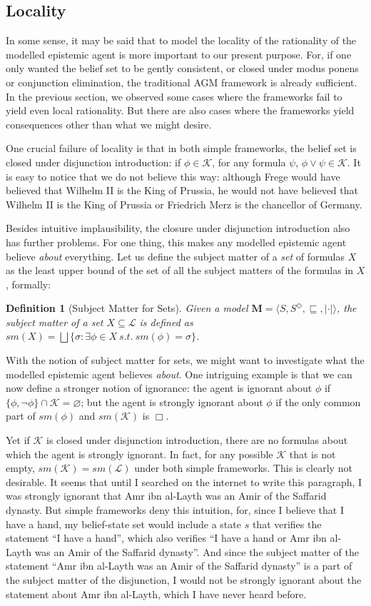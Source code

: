 \documentclass[12pt]{article}
\newtheorem{definition}{Definition}[section]
\newcommand{\K}{\mathcal{K}}
\begin{document}
\subsection{Locality}
In some sense, it may be said that to model the locality of the rationality of the modelled epistemic agent is more important to our present purpose. For, if one only wanted the belief set to be gently consistent, or closed under modus ponens or conjunction elimination, the traditional AGM framework is already sufficient. In the previous section, we observed some cases where the frameworks fail to yield even local rationality. But there are also cases where the frameworks yield consequences other than what we might desire. 
\par
One crucial failure of locality is that in both simple frameworks, the belief set is closed under disjunction introduction: if $\phi \in \K$, for any formula $\psi$, $\phi \lor \psi \in \K$. It is easy to notice that we do not believe this way: although Frege would have believed that Wilhelm II is the King of Prussia, he would not have believed that Wilhelm II is the King of Prussia or Friedrich Merz is the chancellor of Germany. 
\par
Besides intuitive implausibility, the closure under disjunction introduction also has further problems. For one thing, this makes any modelled epistemic agent believe \textit{about} everything. Let us define the subject matter of a \textit{set} of formulas $X$ as the least upper bound of the set of all the subject matters of the formulas in $X$, formally:
\begin{definition}[Subject Matter for Sets]
    Given a model $\bm{M} = \langle S, S^\Diamond, \sqsubseteq, | \cdot  | \rangle$, the subject matter of a set $X \subseteq \mathcal{L}$ is defined as $sm(X) = \bigsqcup \{\sigma: \exists \phi \! \in \! X \ s. t. \ sm(\phi) = \sigma\}$.
\end{definition}
With the notion of subject matter for sets, we might want to investigate what the modelled epistemic agent believes \textit{about}. One intriguing example is that we can now define a stronger notion of ignorance: the agent is ignorant about $\phi$ if $\{\phi, \lnot \phi\} \cap \K = \varnothing$; but the agent is strongly ignorant about $\phi$ if the only common part of $sm(\phi)$ and $sm(\K)$ is $\Box$. 
\par
Yet if $\K$ is closed under disjunction introduction, there are no formulas about which the agent is strongly ignorant. In fact, for any possible $\K$ that is not empty, $sm(\K) = sm(\mathcal{L})$ under both simple frameworks. This is clearly not desirable. It seems that until I searched on the internet to write this paragraph, I was strongly ignorant that Amr ibn al-Layth was an Amir of the Saffarid dynasty. But simple frameworks deny this intuition, for, since I believe that I have a hand, my belief-state set would include a state $s$ that verifies the statement ``I have a hand'', which also verifies ``I have a hand or Amr ibn al-Layth was an Amir of the Saffarid dynasty''. And since the subject matter of the statement ``Amr ibn al-Layth was an Amir of the Saffarid dynasty'' is a part of the subject matter of the disjunction, I would not be strongly ignorant about the statement about Amr ibn al-Layth, which I have never heard before. 
\end{document}
